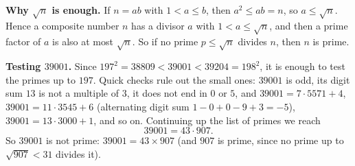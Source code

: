 \textbf{Why $\sqrt n$ is enough.} If $n=ab$ with $1<a\le b$, then $a^2\le ab=n$, so $a\le\sqrt n$. Hence a composite number $n$ has a divisor $a$ with $1<a\le\sqrt n$, and then a prime factor of $a$ is also at most $\sqrt n$. So if no prime $p\le\sqrt n$ divides $n$, then $n$ is prime.

\textbf{Testing $39001$.} Since $197^2=38809<39001<39204=198^2$, it is enough to test the primes up to $197$. Quick checks rule out the small ones: $39001$ is odd, its digit sum $13$ is not a multiple of $3$, it does not end in $0$ or $5$, and $39001=7\cdot5571+4$, $39001=11\cdot3545+6$ (alternating digit sum $1-0+0-9+3=-5$), $39001=13\cdot3000+1$, and so on. Continuing up the list of primes we reach
\[
39001=43\cdot907 .
\]
So $39001$ is $\boxed{\text{not prime}}$: $39001=43\times907$ (and $907$ is prime, since no prime up to $\sqrt{907}<31$ divides it).
